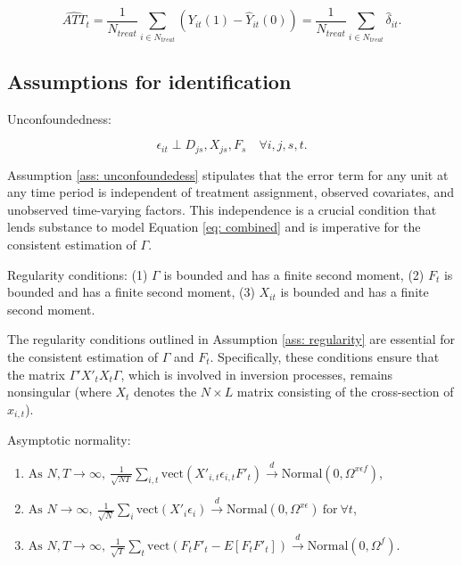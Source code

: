 \documentclass[12pt]{article}
\begin{document}
\begin{equation}
\widehat{ATT}_{t} = \frac{1}{N_{treat}}\sum_{i \in N_{treat}} \left( Y_{it}(1) - \hat{Y}_{it}(0) \right) = \frac{1}{N_{treat}}\sum_{i \in N_{treat}}\hat{\delta}_{it}.
\end{equation}
\subsection{Assumptions for identification}

\begin{assumption}
Unconfoundedness:
\label{ass: unconfoundedess} 
\end{assumption}

\begin{equation}
\epsilon_{it} \perp D_{js}, X_{js}, F_s \quad \forall i, j, s, t.
\label{eq: unconfoundedess}
\end{equation}

Assumption \ref{ass: unconfoundedess} stipulates that the error term for any unit at any time period is independent of treatment assignment, observed covariates, and unobserved time-varying factors. This independence is a crucial condition that lends substance to model Equation \ref{eq: combined} and is imperative for the consistent estimation of $\Gamma$.

\begin{assumption}
Regularity conditions: (1) $\Gamma$ is bounded and has a finite second moment, (2) $F_t$ is bounded and has a finite second moment, (3) $X_{it}$ is bounded and has a finite second moment.
\label{ass: regularity}
\end{assumption}

The regularity conditions outlined in Assumption \ref{ass: regularity} are essential for the consistent estimation of $\Gamma$ and $F_{t}$. Specifically, these conditions ensure that the matrix $\Gamma'X'_tX_t\Gamma$, which is involved in inversion processes, remains nonsingular (where $X_t$ denotes the $N \times L$ matrix consisting of the cross-section of $x_{i,t}$).

\begin{assumption}
Asymptotic normality:
\begin{enumerate}
\renewcommand*\labelenumi{(\theenumi)}
\item $\text{As } N, T \to \infty, \: \frac{1}{\sqrt{NT}} \sum_{i,t} \text{vect}\left( X'_{i,t} \epsilon_{i,t} F'_{t} \right) \xrightarrow{d} \text{Normal} \left(0, \Omega^{x\epsilon f} \right)$,
\item $\text{As } N \to \infty, \: \frac{1}{\sqrt{N}} \sum_{i} \text{vect}\left( X'_{i} \epsilon_{i} \right) \xrightarrow{d} \text{Normal} \left(0, \Omega^{x\epsilon} \right) \: \text{for} \: \forall t$,
\item $\text{As } N, T \to \infty, \: \frac{1}{\sqrt{T}} \sum_{t} \text{vect}\left( F_{t}F'_{t} - E[F_{t}F'_{t}] \right) \xrightarrow{d} \text{Normal} \left(0, \Omega^{f} \right)$.
\end{enumerate}
\label{ass: asy normal}
\end{assumption}
\end{document}
